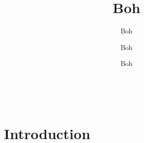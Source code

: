 \documentclass{beamer}
\title{Boh}
\subtitle{Boh}
\author{Boh}
\date{Boh}
\begin{document}
\maketitle


\


\section{Introduction}

\backmatter
\end{document}
